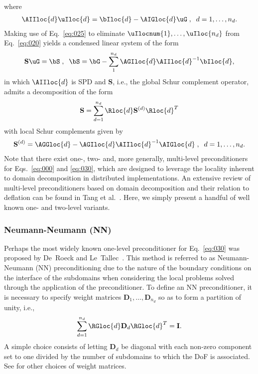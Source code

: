 \documentclass{article}
\begin{document}
where 
\begin{align}\label{eq:025}
\AIIloc{d}\uIloc{d}=\bIloc{d}-\AIGloc{d}\uG
\;,\;\;
d=1,\dots,n_d.
\end{align}
Making use of Eq.~\eqref{eq:025} to eliminate $\uIlocnum{1},\dots,\uIloc{n_d}$ from Eq.~\eqref{eq:020} yields a condensed linear system of the form
\begin{align}\label{eq:030}
\mathbf{S}\uG=\bS
\;,\;\;
\bS=\bG-\sum_{1}^{n_d}\AGIloc{d}\AIIloc{d}^{-1}\bIloc{d},
\end{align}
in which $\AIIloc{d}$ is SPD and $\mathbf{S}$, i.e., the global Schur complement operator, admits a decomposition of the form
\begin{align}
\mathbf{S}=\sum_{d=1}^{n_d}\Rloc{d}\mathbf{S}^{(d)}\Rloc{d}^T
\end{align}
with local Schur complements given by
\begin{align}
\mathbf{S}^{(d)}=
\AGGloc{d}-
\AGIloc{d}\AIIloc{d}^{-1}\AIGloc{d}
\;,\;\;
d=1,\dots,n_d.
\end{align}
Note that there exist one-, two- and, more generally, multi-level preconditioners for Eqs.~\eqref{eq:000} and \eqref{eq:030}, which are designed to leverage the locality inherent to domain decomposition in distributed implementations.
An extensive review of multi-level preconditioners based on domain decomposition and their relation to deflation can be found in Tang et al.~\cite{Tang2009}.
Here, we simply present a handful of well known one- and two-level variants.

\subsubsection{Neumann-Neumann (NN)}
Perhaps the most widely known one-level preconditioner for Eq.~\eqref{eq:030} was proposed by De~Roeck and Le~Tallec~\cite{DeRoeck1991}.
This method is referred to as Neumann-Neumann (NN) preconditioning due to the nature of the boundary conditions on the interface of the subdomains when considering the local problems solved through the application of the preconditioner.
To define an NN preconditioner, it is necessary to specify weight matrices $\mathbf{D}_1,\dots,\mathbf{D}_{n_d}$ so as to form a partition of unity, i.e.,
\begin{align}
\sum_{d=1}^{n_d}
\RGloc{d}
\mathbf{D}_d
\RGloc{d}^T
=\mathbf{I}.
\end{align}
A simple choice consists of letting $\mathbf{D}_d$ be diagonal with each non-zero component set to one divided by the number of subdomains to which the DoF is associated.
See \cite{} for other choices of weight matrices.
\end{document}
